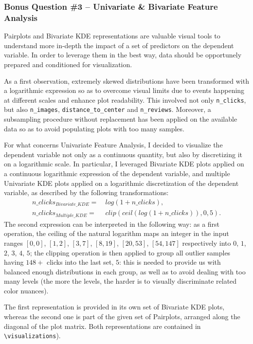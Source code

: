 \documentclass[preprint,12pt,3p]{elsarticle}
\begin{document}
\subsubsection{Bonus Question \#3 -- Univariate \& Bivariate Feature Analysis}
Pairplots and Bivariate KDE representations are valuable visual tools to understand more in-depth the impact of a set of predictors on the dependent variable. In order to leverage them in the best way, data should be opportunely prepared and conditioned for visualization.

As a first observation, extremely skewed distributions have been transformed with a logarithmic expression so as to overcome visual limits due to events happening at different scales and enhance plot readability. This involved not only \verb|n_clicks|, but also \verb|n_images|, \verb|distance_to_center| and \verb|n_reviews|. Moreover, a subsampling procedure without replacement has been applied on the available data so as to avoid populating plots with too many samples.

For what concerns Univariate Feature Analysis, I decided to visualize the dependent variable not only as a continuous quantity, but also by discretizing it on a logarithmic scale. In particular, I leveraged Bivariate KDE plots applied on a continuous logarithmic expression of the dependent variable, and multiple Univariate KDE plots applied on a logarithmic discretization of the dependent variable, as described by the following transformations:
\begin{align}
	n\_clicks_{Bivariate\_KDE} = & \ log(1+n\_clicks),\\
	n\_clicks_{Multiple\_KDE} = & \ clip(ceil(log(1+n\_clicks)), 0, 5).
\end{align}
The second expression can be interpreted in the following way: as a first operation, the ceiling of the natural logarithm maps an integer in the input ranges $[0,0]$, $[1,2]$, $[3,7]$, $[8,19]$, $[20,53]$, $[54,147]$ respectively into $0$, $1$, $2$, $3$, $4$, $5$; the clipping operation is then applied to group all outlier samples having $148+$ clicks into the last set, $5$: this is needed to provide us with balanced enough distributions in each group, as well as to avoid dealing with too many levels (the more the levels, the harder is to visually discriminate related color nuances).

The first representation is provided in its own set of Bivariate KDE plots, whereas the second one is part of the given set of Pairplots, arranged along the diagonal of the plot matrix. Both representations are contained in \verb|\visualizations|).
\end{document}
